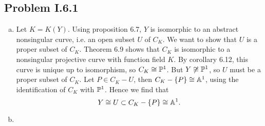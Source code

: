 \documentclass{mathnotes}
\begin{document}
\subsection*{Problem I.6.1}
\begin{enumerate}[(a)]
\item Let $K = K(Y)$. Using proposition 6.7, $Y$ is isomorphic to an abstract nonsingular curve, i.e. an open subset $U$ of
	$C_K$. We want to show that $U$ is a proper subset of $C_K$. Theorem 6.9 shows that $C_K$ is isomorphic to a 
	nonsingular projective curve with function field $K$. By corollary 6.12, this curve is unique up to isomorphism, so
	$C_K \cong \mathbb{P}^1$. But $Y \not \cong \mathbb{P}^1$, so $U$ must be a proper subset of $C_K$. Let $P \in C_K - U$, then $C_K - \{P\}
	\cong \mathbb{A}^1$, using the identification of $C_K$ with $\mathbb{P}^1$. Hence we find that
	\[	Y \cong U \subset C_K - \{P\} \cong \mathbb{A}^1.	\]
\item 
	
\end{enumerate}
\end{document}
